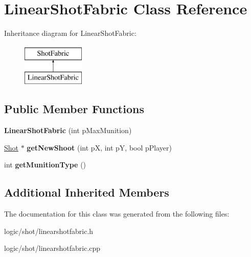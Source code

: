 \hypertarget{class_linear_shot_fabric}{\section{Linear\-Shot\-Fabric Class Reference}
\label{class_linear_shot_fabric}
}
Inheritance diagram for Linear\-Shot\-Fabric\-:\begin{figure}[H]
\begin{center}
\leavevmode
\includegraphics[height=2.000000cm]{class_linear_shot_fabric}
\end{center}
\end{figure}
\subsection*{Public Member Functions}
\begin{DoxyCompactItemize}
\item 
\hypertarget{class_linear_shot_fabric_a8e49b3e5c9930d996ceff1544d7deed4}{{\bfseries Linear\-Shot\-Fabric} (int p\-Max\-Munition)}\label{class_linear_shot_fabric_a8e49b3e5c9930d996ceff1544d7deed4}

\item 
\hypertarget{class_linear_shot_fabric_a62f5fd67da6fa1c985671a122e35f3fd}{\hyperlink{class_shot}{Shot} $\ast$ {\bfseries get\-New\-Shoot} (int p\-X, int p\-Y, bool p\-Player)}\label{class_linear_shot_fabric_a62f5fd67da6fa1c985671a122e35f3fd}

\item 
\hypertarget{class_linear_shot_fabric_a395b22701c39f96c4ff5ccd038c552d0}{int {\bfseries get\-Munition\-Type} ()}\label{class_linear_shot_fabric_a395b22701c39f96c4ff5ccd038c552d0}

\end{DoxyCompactItemize}
\subsection*{Additional Inherited Members}


The documentation for this class was generated from the following files\-:\begin{DoxyCompactItemize}
\item 
logic/shot/linearshotfabric.\-h\item 
logic/shot/linearshotfabric.\-cpp\end{DoxyCompactItemize}
